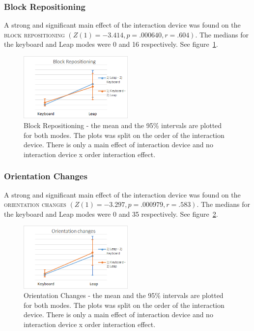 \subsubsection{Block Repositioning}
A strong and significant main effect of the interaction device was found on the \textsc{block repositioning} $(Z(1) = -3.414, p = .000640, r = .604)$. The medians for the 
keyboard and Leap modes were 0 and 16 respectively. See figure~\ref{fig:block_repositioning}.

\begin{figure}[H]
\centering
\includegraphics[width=0.5\textwidth]{imgs/results/block_repositioning}
\caption{Block Repositioning - the mean and the 95\% intervals are plotted for both modes. The plots was split on the order of the interaction device. There is only a 
main effect of interaction device and no interaction device x order interaction effect.}
\label{fig:block_repositioning}
\end{figure}

\subsubsection{Orientation Changes}

A strong and significant main effect of the interaction device was found on the \textsc{orientation changes} $(Z(1) = -3.297, p = .000979, r = .583)$. The medians for the 
keyboard and Leap modes were 0 and 35 respectively. See figure~\ref{fig:orientation_changes}.

\begin{figure}[H]
\centering
\includegraphics[width=0.5\textwidth]{imgs/results/orientation_changes}
\caption{Orientation Changes - the mean and the 95\% intervals are plotted for both modes. The plots was split on the order of the interaction device. There is only a 
main effect of interaction device and no interaction device x order interaction effect.}
\label{fig:orientation_changes}
\end{figure}



